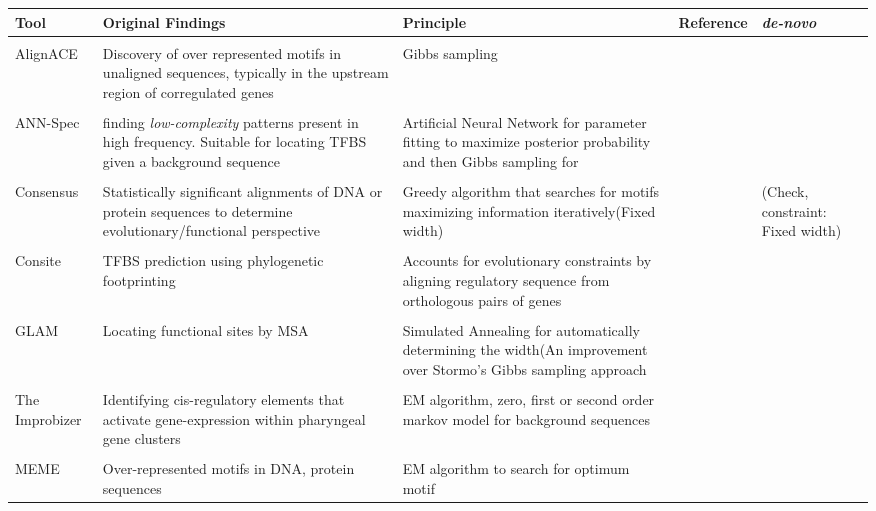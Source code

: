 \documentclass[a4paper,11pt]{article}
\newcommand{\red}[1]{{\color{red!80!orange}#1}}
\newcommand{\cmark}{\ding{51}}%
\newcommand{\xmark}{\ding{55}}%
\begin{document}
\footnotesize
\begin{longtable}{ P{3cm} p{4.6cm} p{4.6cm} P{2cm} P{2cm}  }
\hline
\textbf{Tool} & \textbf{Original Findings} & \textbf{Principle} & \textbf{Reference} & \textit{de-novo} \\
\hline\\
AlignACE & Discovery of over represented motifs in unaligned sequences, typically in the upstream region of corregulated genes & Gibbs sampling & \cite{roth_finding_1998} & \cmark \\
\hline\\
ANN-Spec & finding \textit{low-complexity} patterns present in high frequency. Suitable for locating TFBS given a background sequence & Artificial Neural Network for parameter fitting to maximize posterior probability and then Gibbs sampling for & \cite{workman_ann-spec:_2000}  & \cmark\\
\hline\\
\red{Consensus} & Statistically significant alignments of DNA or protein sequences to determine evolutionary/functional perspective  & Greedy algorithm that searches for motifs maximizing information iteratively(Fixed width) & \cite{hertz_identifying_1999} & \xmark (Check, constraint: Fixed width)\\
\hline \\
\red{Consite} & TFBS prediction using phylogenetic footprinting & Accounts for evolutionary constraints by aligning regulatory sequence from orthologous pairs of genes  & \cite{sandelin_consite:_2004}   & \xmark\\
\hline \\
GLAM & Locating functional sites by MSA & Simulated Annealing for automatically determining the width(An improvement over Stormo's Gibbs sampling approach \cite{hertz_identifying_1999} & \cite{frith_finding_2004} & \cmark \\
\hline \\
The Improbizer & Identifying cis-regulatory elements that activate gene-expression within pharyngeal gene clusters & EM algorithm, zero, first or second order markov model for background sequences  & \cite{ao_environmentally_2004} & \cmark \\
\hline \\
MEME & Over-represented motifs in DNA, protein sequences  & EM algorithm to search for optimum motif & \cite{bailey_fitting_1994} & \cmark \\

\end{longtable}
\end{document}
